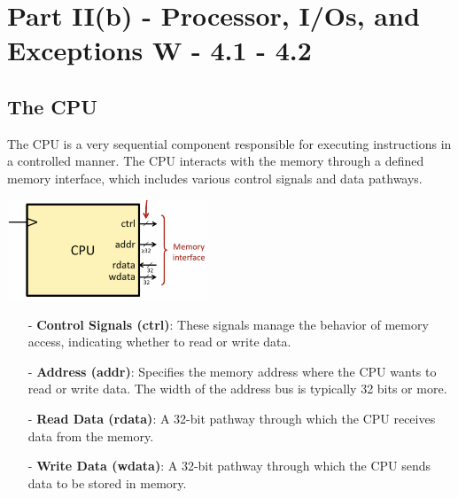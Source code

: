 \chapter{Part II(b) - Processor, I/Os, and Exceptions W - 4.1 - 4.2}
\section{The CPU}

The CPU is a very sequential component responsible for executing instructions in a controlled manner. The CPU interacts with the memory through a defined memory interface, which includes various control signals and data pathways.
\begin{center}
    \includegraphics[width=0.45\textwidth]{chapters/chapter2b/images/cpu.png}
\end{center}
\begin{itemize}
    \item[-] \textbf{Control Signals (ctrl)}: These signals manage the behavior of memory access, indicating whether to read or write data.
    \item[-] \textbf{Address (addr)}: Specifies the memory address where the CPU wants to read or write data. The width of the address bus is typically 32 bits or more.
    \item[-] \textbf{Read Data (rdata)}: A 32-bit pathway through which the CPU receives data from the memory.
    \item[-] \textbf{Write Data (wdata)}: A 32-bit pathway through which the CPU sends data to be stored in memory.
\end{itemize}

